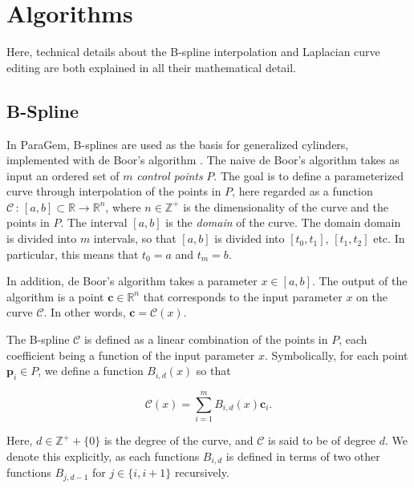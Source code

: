 \documentclass[english]{article}
\begin{document}

\clearpage

\section{Algorithms} \label{section_algorithms}

Here, technical details about the B-spline interpolation and Laplacian curve editing are both explained in all their mathematical detail.

\subsection{B-Spline} \label{section_b_spline}


In ParaGem, B-splines are used as the basis for generalized cylinders, implemented with de Boor's algorithm \cite{deboor}. The naive de Boor's algorithm takes as input an ordered set of $m$ \textit{control points} $P$. The goal is to define a parameterized curve through interpolation of the points in $P$, here regarded as a function $\mathcal{C} \, : \, [a, b] \subset \mathbb{R} \rightarrow \mathbb{R}^n$, where $n \in \mathbb{Z^+}$ is the dimensionality of the curve and the points in $P$. The interval $[a, b]$ is the \textit{domain} of the curve. The domain domain is divided into $m$ intervals, so that $[a, b]$ is divided into $[t_0, t_1]$, $[t_1, t_2]$ etc. In particular, this means that $t_0 = a$ and $t_m = b$.

In addition, de Boor's algorithm takes a parameter $x \in [a, b]$. The output of the algorithm is a point $\mathbf{c} \in \mathbb{R}^n$ that corresponds to the input parameter $x$ on the curve $\mathcal{C}$. In other words, $\mathbf{c} = \mathcal{C}(x)$.

The B-spline $\mathcal{C}$ is defined as a linear combination of the points in $P$, each coefficient being a function of the input parameter $x$. Symbolically, for each point $\mathbf{p}_i \in P$, we define a function $B_{i,d}(x)$ so that

\[
\mathcal{C}(x) = \sum_{i = 1}^mB_{i,d}(x)\mathbf{c}_i.
\]

Here, $d \in \mathbb{Z^+} + \{0\}$ is the degree of the curve, and $\mathcal{C}$ is said to be of degree $d$. We denote this explicitly, as each functions $B_{i,d}$ is defined in terms of two other functions $B_{j,d-1}$ for $j \in \{i, i + 1\}$ recursively.
\end{document}
